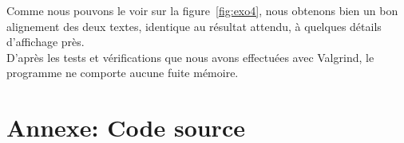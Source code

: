 \documentclass{article}
\begin{document}
Comme nous pouvons le voir sur la figure~\ref{fig:exo4}, nous obtenons bien un
bon alignement des deux textes, identique au résultat attendu, à quelques
détails d'affichage près.\\

D'après les tests et vérifications que nous avons effectuées avec Valgrind, le
programme ne comporte aucune fuite mémoire.\\


\clearpage
\section{Annexe: Code source}
		
\end{document}
